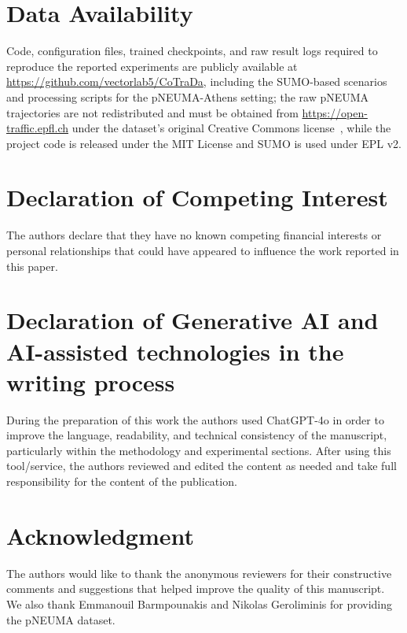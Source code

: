 \documentclass[final,3p,times,review,sort&compress]{elsarticle}
\begin{document}
\section*{Data Availability}

Code, configuration files, trained checkpoints, and raw result logs required to reproduce the reported experiments are publicly available at \url{https://github.com/vectorlab5/CoTraDa}, including the SUMO-based scenarios and processing scripts for the pNEUMA-Athens setting; the raw pNEUMA trajectories are not redistributed and must be obtained from \url{https://open-traffic.epfl.ch} under the dataset's original Creative Commons license~\cite{barmpounakis2020new}, while the project code is released under the MIT License and SUMO is used under EPL v2.



\section*{Declaration of Competing Interest}
The authors declare that they have no known competing financial interests or personal relationships that could have appeared to influence the work reported in this paper.

\section*{Declaration of Generative AI and AI-assisted technologies in the writing process}
During the preparation of this work the authors used ChatGPT-4o in order to improve the language, readability, and technical consistency of the manuscript, particularly within the methodology and experimental sections. After using this tool/service, the authors reviewed and edited the content as needed and take full responsibility for the content of the publication.

\section*{Acknowledgment}
The authors would like to thank the anonymous reviewers for their constructive comments and suggestions that helped improve the quality of this manuscript. We also thank Emmanouil Barmpounakis and Nikolas Geroliminis for providing the pNEUMA dataset.



\end{document}
